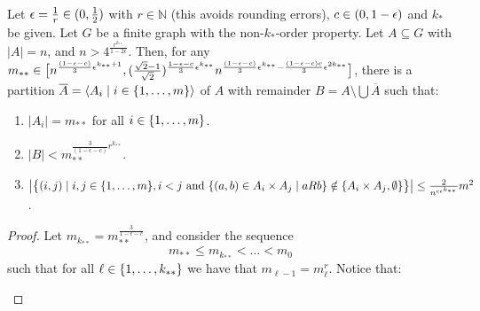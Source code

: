         \begin{theorem} \label{thm:existance_of_equitative_partition_with_perfect_pairs_but_with_bound_exceptional_pairs}
            Let $\epsilon = \frac{1}{r} \in ( 0, \frac{1}{2} )$ with $r \in \mathbb{N}$ (this avoids rounding errors),
            $c\in ( 0,1-\epsilon )$ and $k_*$ be given.
            Let $G$ be a finite graph with the non-$k_*$-order property.
            Let $A \subseteq G$ with $|A| = n$, and $n > 4^{\frac{r^{k_{**}}}{1-2\epsilon}}$.
            Then, for any $m_{**} \in \bigl[ n^{\frac{(1-\epsilon-c)}{3}\epsilon^{k_{**}+1}},
            ( \frac{\sqrt{2}-1}{\sqrt{2}} )^{\frac{1-\epsilon-c}{3}\epsilon^{k_{**}}} n^{\frac{(1-\epsilon-c)}{3}\epsilon^{k_{**}} -
            \frac{(1-\epsilon-c)c}{3}\epsilon^{2k_{**}}} \bigr]$, there is a partition
            $\overline{A} = \left< A_i \mid i \in \{ 1, \dots, m \} \right>$ of $A$ with remainder
            $B = A \setminus \bigcup \overline{A}$ such that:
            \begin{enumerate}
                \item\label{itm:existance_of_equitative_partition_with_perfect_pairs_but_with_bound_exceptional_pairs.1}
                    $|A_i| = m_{**}$ for all $i \in \{ 1, \dots, m \}$.
                \item\label{itm:existance_of_equitative_partition_with_perfect_pairs_but_with_bound_exceptional_pairs.2}
                    $|B| < m_{**}^{\frac{3}{(1-\epsilon-c)}r^{k_{**}}}$.
                \item\label{itm:existance_of_equitative_partition_with_perfect_pairs_but_with_bound_exceptional_pairs.3}
                    $\bigl| \bigl\{  (i,j) \mid i,j \in \{ 1, \dots, m \}, i < j \text{ and }
                    \{ (a,b) \in A_i \times A_j \mid a R b \} \notin
                    \{ A_i \times A_j, \emptyset \} \bigr\} \bigr|
                    \leq \frac{2}{n^{c\epsilon^{k_{**}}}} m^2$.
            \end{enumerate}
            \begin{proof}
                Let $m_{k_{**}} = m_{**}^{\frac{3}{1-\epsilon-c}}$, and consider the sequence
                \[
                    m_{**} \leq m_{k_{**}} < \dots < m_0
                \]
                such that for all $\ell \in \{ 1, \dots, k_{**} \}$ we have that $m_{\ell-1} = m_\ell^r$.
                Notice that:
                \begin{enumerate}

\end{enumerate}
\end{proof}
\end{theorem}

